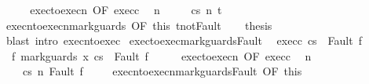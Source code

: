 \begin{isabellebody}
%
\isadelimproof
%
\endisadelimproof
%
\isatagproof
{}\isamarkupfalse%
\ {\isacharminus}\isanewline
\ \ \isamarkupfalse%
\ exec{\isacharunderscore}to{\isacharunderscore}execn\ {\isacharbrackleft}OF\ exec{\isacharunderscore}c{\isacharbrackright}\ \isamarkupfalse%
\ n\ \isanewline
\ \ \ \ {\isachardoublequoteopen}{\isasymGamma}{\isasymturnstile}{\isasymlangle}c{\isacharcomma}s{\isasymrangle}\ {\isacharequal}n{\isasymRightarrow}\ t{\isachardoublequoteclose}\ \isacommand{{\isachardot}{\isachardot}}\isamarkupfalse%
\isanewline
\ \ \isamarkupfalse%
\ execn{\isacharunderscore}to{\isacharunderscore}execn{\isacharunderscore}mark{\isacharunderscore}guards\ {\isacharbrackleft}OF\ this\ t{\isacharunderscore}not{\isacharunderscore}Fault{\isacharbrackright}\isanewline
\ \ \isamarkupfalse%
\ {\isacharquery}thesis\isanewline
\ \ \ \ \isamarkupfalse%
\ {\isacharparenleft}blast\ intro{\isacharcolon}\ execn{\isacharunderscore}to{\isacharunderscore}exec{\isacharparenright}\isanewline
{}\isamarkupfalse%
%
\endisatagproof
{\isafoldproof}%
%
\isadelimproof
\isanewline
%
\endisadelimproof
\isanewline
{}\isamarkupfalse%
\ exec{\isacharunderscore}to{\isacharunderscore}exec{\isacharunderscore}mark{\isacharunderscore}guards{\isacharunderscore}Fault{\isacharcolon}\isanewline
\ \ exec{\isacharunderscore}c{\isacharcolon}\ {\isachardoublequoteopen}{\isasymGamma}{\isasymturnstile}{\isasymlangle}c{\isacharcomma}s{\isasymrangle}\ {\isasymRightarrow}\ Fault\ f{\isachardoublequoteclose}\isanewline
\ \ {\isachardoublequoteopen}{\isasymexists}f{\isacharprime}{\isachardot}\ {\isasymGamma}{\isasymturnstile}{\isasymlangle}mark{\isacharunderscore}guards\ x\ c{\isacharcomma}s{\isasymrangle}\ {\isasymRightarrow}\ Fault\ f{\isacharprime}{\isachardoublequoteclose}\isanewline
%
\isadelimproof
%
\endisadelimproof
%
\isatagproof
{}\isamarkupfalse%
\ {\isacharminus}\isanewline
\ \ \isamarkupfalse%
\ exec{\isacharunderscore}to{\isacharunderscore}execn\ {\isacharbrackleft}OF\ exec{\isacharunderscore}c{\isacharbrackright}\ \isamarkupfalse%
\ n\ \isanewline
\ \ \ \ {\isachardoublequoteopen}{\isasymGamma}{\isasymturnstile}{\isasymlangle}c{\isacharcomma}s{\isasymrangle}\ {\isacharequal}n{\isasymRightarrow}\ Fault\ f{\isachardoublequoteclose}\ \isacommand{{\isachardot}{\isachardot}}\isamarkupfalse%
\isanewline
\ \ \isamarkupfalse%
\ execn{\isacharunderscore}to{\isacharunderscore}execn{\isacharunderscore}mark{\isacharunderscore}guards{\isacharunderscore}Fault\ {\isacharbrackleft}OF\ this{\isacharbrackright}\isanewline

\end{isabellebody}
